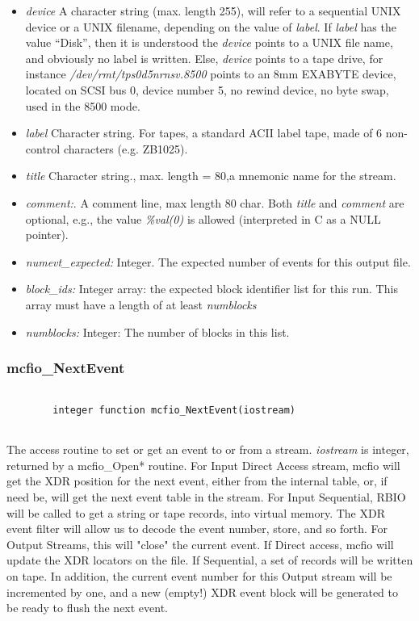 \begin{itemize} 
\item {\em device} A  character
 string (max. length 255), will refer to a  sequential UNIX device or a 
 UNIX filename, depending on the value of {\em label}.  If {\em label} has 
 the value ``Disk'', then it is understood the {\em device} points to 
 a UNIX file name, and obviously no label is written. Else, {\em device} points 
 to a tape drive, for instance {\em /dev/rmt/tps0d5nrnsv.8500} points to 
 an 8mm EXABYTE device, located on SCSI bus 0, device number 5, no rewind 
 device, no byte swap, used in the 8500 mode.  
\item {\em label} Character string. For tapes, a standard ACII label tape, 
made of 6 non-control characters (e.g. ZB1025). 
\item {\em title} Character string., max. length = 80,a mnemonic name for the 
stream.
\item {\em comment:}. A comment line, max length 80 char. Both {\em title }
and {\em comment} are optional, e.g., the value {\em \%val(0)} is allowed
(interpreted in C as a NULL pointer).
\item {\em numevt\_expected:} Integer.  The expected number of events for this
output  file.
\item {\em block\_ids:} Integer array: the expected block identifier list for 
this run. This array must have a length of at least {\em numblocks}
\item {\em numblocks:} Integer: The number of blocks in this list.
\end{itemize}


\subsubsection{mcfio\_NextEvent}

\begin{verbatim}

        integer function mcfio_NextEvent(iostream)
	
\end{verbatim}
The access routine to set or get an event to or from a  stream. {\em iostream}
is integer, returned by a mcfio\_Open* routine.  For Input Direct Access stream,
mcfio will get the XDR position  for the next event, either from the internal
table, or, if  need be, will get the next event table in the stream.  For Input
Sequential, RBIO will be called to get a string  or tape records, into virtual
memory. The XDR event filter will allow us to decode the event number, store,
and so forth. For Output Streams, this will "close" the current event.  If 
Direct access, mcfio will update the XDR locators on the file. If Sequential, a
set of records will be written on tape.  In addition, the current event number
for this Output stream will  be incremented by one, and a new (empty!) XDR
event block will be  generated to be ready to flush the next event.

